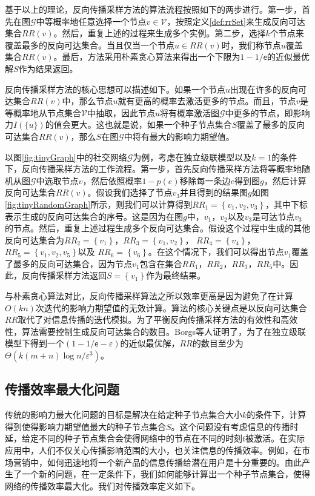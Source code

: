 基于以上的理论，反向传播采样方法的算法流程按照如下的两步进行。第一步，首先在图$\mathcal{G}$中等概率地任意选择一个节点$v \in \mathcal{V}$，按照定义\ref{def:rrSet}来生成反向可达集合${RR}\left(v\right)$。然后，重复上述的过程来生成多个实例。第二步，选择$k$个节点来覆盖最多的反向可达集合。当且仅当一个节点$u\in RR\left(v\right)$时，我们称节点$u$覆盖集合$RR\left(v\right)$。最后，方法采用朴素贪心算法来得出一个下限为$1-1/\mathsf{e}$的近似最优解$S$作为结果返回。

反向传播采样方法的核心思想可以描述如下。如果一个节点$u$出现在许多的反向可达集合$RR\left(v\right)$中，那么节点$u$就有更高的概率去激活更多的节点。而且，节点$v$是等概率地从节点集合$\mathcal{V}$中抽取，因此节点$u$将有概率激活图$\mathcal{G}$中更多的节点，即影响力$I\left(\{u\}\right)$的值会更大。这也就是说，如果一个种子节点集合$S$覆盖了最多的反向可达集合$RR\left(v\right)$，那么$S$在图$\mathcal{G}$中将有最大的影响力期望值。

以图\ref{fig:tinyGraph}中的社交网络$\mathcal{G}$为例，考虑在独立级联模型以及$k=1$的条件下，反向传播采样方法的工作流程。第一步，首先反向传播采样方法将等概率地随机从图$\mathcal{G}$中选取节点$v$，然后依照概率$1-p\left(e\right)$移除每一条边$e$得到图$g$，然后计算反向可达集合$RR\left(v\right)$。假设我们选择了节点$v_3$并且得到的结果图$g$如图\ref{fig:tinyRandomGraph}所示，则我们可以计算得到${RR}_1=\left\{v_1, v_2, v_3\right\}$，其中下标表示生成的反向可达集合的序号。这是因为在图$g$中，$v_1$，$v_2$以及$v_3$是可达节点$v_3$的节点。然后，重复上述过程生成多个反向可达集合。假设这个过程中生成的其他反向可达集合为${RR}_2=\left\{v_1\right\}$，${RR}_3=\left\{v_1, v_2\right\}$， ${RR}_4=\left\{v_4\right\}$，${RR}_5=\left\{v_1, v_2, v_5\right\}$以及 ${RR}_6=\left\{v_6\right\}$。在这个情况下，我们可以得出节点$v_1$覆盖了最多的反向可达集合，因为节点$v_1$包含在集合${RR}_1$，${RR}_2$，${RR}_3$，${RR}_5$中。因此，反向传播采样方法返回$S=\left\{v_1\right\}$作为最终结果。

与朴素贪心算法对比，反向传播采样算法之所以效率更高是因为避免了在计算$O\left(kn\right)$次迭代的影响力期望值的无效计算。算法的核心关键点是以反向可达集合$RR$取代了对信息传播的迭代模拟。为了平衡反向传播采样方法的有效性和高效性，算法需要控制生成反向可达集合的数目。Borgs等人证明了，为了在独立级联模型下得到一个$\left(1-1/\mathsf{e}-\varepsilon\right)$的近似最优解，$RR$的数目至少为$\Theta\left(k\left(m+n\right)\log{n}/\varepsilon^3\right)$。

\subsection{传播效率最大化问题}
\label{subsec4:efficiency}
传统的影响力最大化问题的目标是解决在给定种子节点集合大小$k$的条件下，计算得到使得影响力期望值最大的种子节点集合$S$。这个问题没有考虑信息的传播时延，给定不同的种子节点集合会使得网络中的节点在不同的时刻$t$被激活。在实际应用中，人们不仅关心传播影响范围的大小，也关注信息的传播效率。例如，在市场营销中，如何迅速地将一个新产品的信息传播给潜在用户是十分重要的。由此产生了一个新的问题，在一定条件下，我们如何能够计算出一个种子节点集合，使得网络的传播效率最大化。我们对传播效率定义如下。

